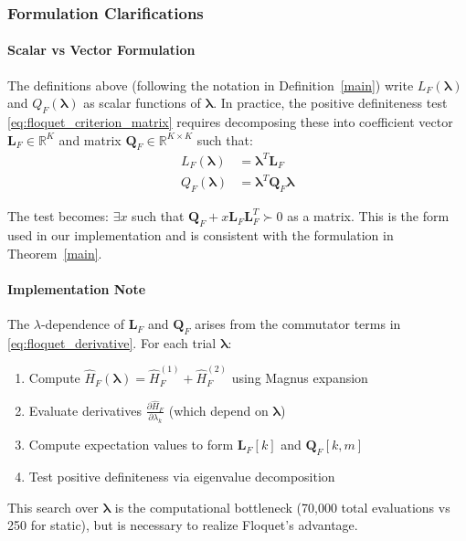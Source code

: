 \subsubsection{Formulation Clarifications}

\paragraph{Scalar vs Vector Formulation}

The definitions above (following the notation in Definition~\ref{main}) write $L_F(\boldsymbol{\lambda})$ and $Q_F(\boldsymbol{\lambda})$ as scalar functions of $\boldsymbol{\lambda}$. In practice, the positive definiteness test \cref{eq:floquet_criterion_matrix} requires decomposing these into coefficient vector $\mathbf{L}_F \in \mathbb{R}^K$ and matrix $\mathbf{Q}_F \in \mathbb{R}^{K \times K}$ such that:
\begin{align}
L_F(\boldsymbol{\lambda}) &= \boldsymbol{\lambda}^T \mathbf{L}_F \\
Q_F(\boldsymbol{\lambda}) &= \boldsymbol{\lambda}^T \mathbf{Q}_F \boldsymbol{\lambda}
\end{align}

The test becomes: $\exists x$ such that $\mathbf{Q}_F + x \mathbf{L}_F \mathbf{L}_F^T \succ 0$ as a matrix. This is the form used in our implementation and is consistent with the formulation in Theorem~\ref{main}.

\paragraph{Implementation Note}

The $\lambda$-dependence of $\mathbf{L}_F$ and $\mathbf{Q}_F$ arises from the commutator terms in \cref{eq:floquet_derivative}. For each trial $\boldsymbol{\lambda}$:
\begin{enumerate}
\item Compute $\hat{H}_F(\boldsymbol{\lambda}) = \hat{H}_F^{(1)} + \hat{H}_F^{(2)}$ using Magnus expansion
\item Evaluate derivatives $\frac{\partial \hat{H}_F}{\partial \lambda_k}$ (which depend on $\boldsymbol{\lambda}$)
\item Compute expectation values to form $\mathbf{L}_F[k]$ and $\mathbf{Q}_F[k,m]$
\item Test positive definiteness via eigenvalue decomposition
\end{enumerate}

This search over $\boldsymbol{\lambda}$ is the computational bottleneck (70,000 total evaluations vs 250 for static), but is necessary to realize Floquet's advantage.

